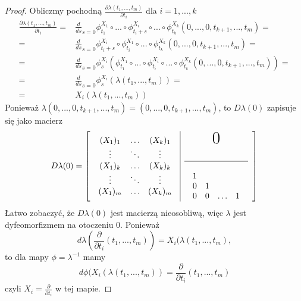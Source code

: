 \begin{proof}
Obliczmy pochodną $\frac{\partial \lambda(t_1,...,t_m)}{\partial t_i}$ dla $i=1,...,k$
\begin{align*}
  \frac{\partial \lambda(t_1,...,t_m)}{\partial t_i}=&\frac{d}{ds}_{s=0}\phi_{t_1}^{X_1}\circ...\circ\phi_{t_i+s}^{X_i}\circ...\circ\phi_{t_k}^{X_k}(0,...,0,t_{k+1},...,t_m)=\\
  =&\frac{d}{ds}_{s=0}\phi_{t_i+s}^{X_i}\circ\phi_{t_i}^{X_1}\circ...\circ\phi_{t_k}^{X_k}(0,...,0,t_{k+1},...,t_m)=\\
  =&\frac{d}{ds}_{s=0}\phi_s^{X_i}(\phi_{t_1}^{X_1}\circ...\circ\phi_{t_i}^{X_i}\circ...\circ\phi_{t_k}^{X_k}(0,...,0,t_{k+1},...,t_m))=\\
  =&\frac{d}{ds}_{s=0}\phi_s^{X_i}(\lambda(t_1,...,t_m))=\\
  =&X_i(\lambda(t_1,...,t_m))
\end{align*}
Ponieważ $\lambda(0,...,0,t_{k+1},...,t_m)=(0,...,0,t_{k+1},...,t_m)$, to $D\lambda(0)$ zapisuje się jako macierz
$$D\lambda(0)=
\left[
  \begin{array}{c | c}
    \begin{array}{c c c}
      (X_1)_1 &\hdots & (X_k)_1\\
      \vdots & \ddots & \vdots \\ %
      (X_1)_k & \hdots & (X_k)_k\\
      \vdots & \ddots & \vdots \\ %
        (X_1)_m & \hdots & (X_k)_m %
  \end{array} & 
    \begin{array}{c}
        \makebox(0,0){\text{\huge0}}\\
          \\
          \\
      \hline
      \\
      \begin{array}{c c c c}
        1\\
        0 & 1\\
        0 & 0 & \hdots & 1
      \end{array}
    \end{array}
  \end{array}
\right]
$$
Łatwo zobaczyć, że $D\lambda(0)$ jest macierzą nieosobliwą, więc $\lambda$ jest dyfeomorfizmem na otoczeniu $0$. Ponieważ 
$$d\lambda(\frac{\partial}{\partial t_i}(t_1,...,t_m))=X_i(\lambda(t_1,...,t_m),$$
to dla mapy $\phi=\lambda^{-1}$ mamy
$$d\phi(X_i(\lambda(t_1,...,t_m))=\frac{\partial}{\partial t_i}(t_1,...,t_m)$$
czyli $X_i=\frac{\partial}{\partial t_i}$ w tej mapie.
\end{proof}
